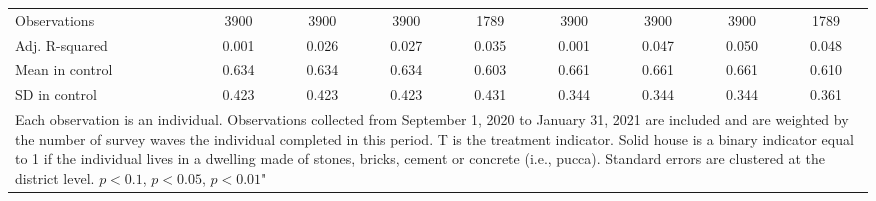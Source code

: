 {\begin{tabular}{l*{8}{c}}
\hline
Observations    &\num{3900}         &\num{3900}         &\num{3900}         &\num{1789}         &\num{3900}         &\num{3900}         &\num{3900}         &\num{1789}         \\
Adj. R-squared  &    0.001         &    0.026         &    0.027         &    0.035         &    0.001         &    0.047         &    0.050         &    0.048         \\
Mean in control &    0.634         &    0.634         &    0.634         &    0.603         &    0.661         &    0.661         &    0.661         &    0.610         \\
SD in control   &    0.423         &    0.423         &    0.423         &    0.431         &    0.344         &    0.344         &    0.344         &    0.361         \\
\hline\hline
\multicolumn{9}{p{1.02\linewidth}}{\scriptsize Each observation is an individual. Observations collected from September 1, 2020 to January 31, 2021 are included and are weighted by the number of survey waves the individual completed in this period. T is the treatment indicator. Solid house is a binary indicator equal to 1 if the individual lives in a dwelling made of stones, bricks, cement or concrete (i.e., pucca). Standard errors are clustered at the district level. \sym{*} \(p<0.1\), \sym{**} \(p<0.05\), \sym{***} \(p<0.01\)"}\\
\end{tabular}
} 

